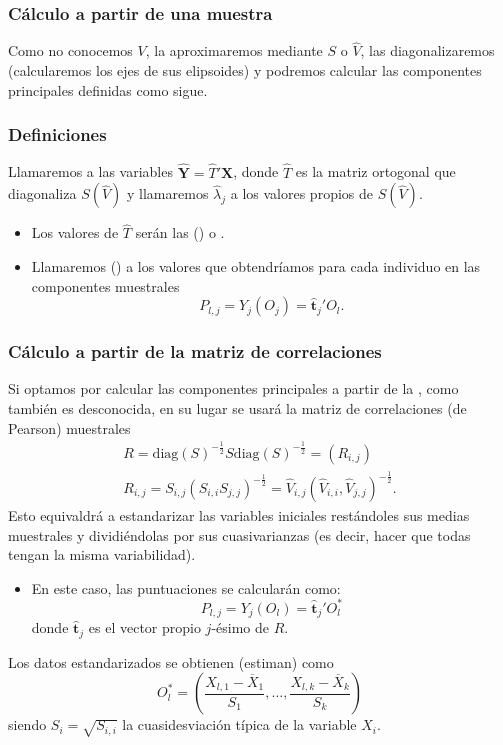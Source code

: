 \subsubsection{Cálculo a partir de una muestra}
Como no conocemos $V$, la aproximaremos mediante $S$ o $\hat{V}$, las diagonalizaremos (calcularemos los ejes de sus elipsoides) y podremos calcular las componentes principales definidas como sigue.

\subsubsection{Definiciones}
Llamaremos  a las variables $\mathbf{\hat{Y}}=\hat{T}'\mathbf{X}$, donde $\hat{T}$ es la matriz ortogonal que diagonaliza $S(\hat{V})$ y llamaremos  $\hat{\lambda}_j$ a los valores propios de $S(\hat{V})$.
\begin{itemize}
	\item Los valores de $\hat{T}$ serán las  () o .
	\item Llamaremos  () a los valores que obtendríamos para cada individuo en las componentes muestrales \[ P_{l,j}=Y_j(O_j)=\mathbf{\hat{t}}_j'O_l. \]
\end{itemize}
\subsubsection{Cálculo a partir de la matriz de correlaciones}
Si optamos por calcular las componentes principales a partir de la , como también es desconocida, en su lugar se usará la matriz de correlaciones (de Pearson) muestrales \[ \begin{array}{c}
	R=\mathrm{diag}(S)^{-\frac{1}{2}}S\mathrm{diag}(S)^{-\frac{1}{2}}=(R_{i,j})\\
	R_{i,j}=S_{i,j}(S_{i,i}S_{j,j})^{-\frac{1}{2}}=\hat{V}_{i,j}(\hat{V}_{i,i},\hat{V}_{j,j})^{-\frac{1}{2}}.
\end{array} \]
Esto equivaldrá a estandarizar las variables iniciales restándoles sus medias muestrales y dividiéndolas por sus cuasivarianzas (es decir, hacer que todas tengan la misma variabilidad).
\begin{itemize}
	\item En este caso, las puntuaciones se calcularán como: \[ P_{l,j}=Y_j(O_l)=\mathbf{\hat{t}}_j'O_l^* \] donde $\mathbf{\hat{t}}_j$ es el vector propio $j$-ésimo de $R$.

\end{itemize}
Los datos estandarizados se obtienen (estiman) como \[ O_l^*=\left(\dfrac{X_{l,1}-\overline{X}_1}{S_1},\dots,\dfrac{X_{l,k}-\overline{X}_k}{S_k}\right) \] siendo $S_i=\sqrt{S_{i,i}}$ la cuasidesviación típica de la variable $X_i$.

